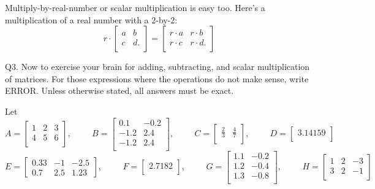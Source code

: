 Multiply-by-real-number or scalar multiplication is easy too.
Here's a multiplication of a real number with a 2-by-2:
\[
r \cdot 
\begin{bmatrix}
a & b \\
c & d.\\
\end{bmatrix}
=
\begin{bmatrix}
r \cdot a & r \cdot b \\
r \cdot c & r \cdot d.\\
\end{bmatrix}
\]

\newpage

Q3. Now to exercise your brain for adding, subtracting, and scalar 
multiplication of matrices.
For those expressions where the operations do not make sense,
write ERROR.
Unless otherwise stated, all answers must be exact.


Let 
\[
A
= 
\begin{bmatrix}
1 & 2 & 3 \\
4 & 5 & 6 \\
\end{bmatrix}
, 
\hspace{1cm}
B
= 
\begin{bmatrix}
0.1 & -0.2 \\
-1.2 & 2.4 \\
-1.2 & 2.4 \\
\end{bmatrix}
, 
\hspace{1cm}
C
= 
\begin{bmatrix}
\frac{2}{3} & \frac{4}{7} \\
\end{bmatrix}
, 
\hspace{1cm}
D
= 
\begin{bmatrix}
3.14159 \\
\end{bmatrix}
\]
\[
E
= 
\begin{bmatrix}
0.33 & -1 & -2.5 \\
0.7 & 2.5 & 1.23
\end{bmatrix}
, 
\hspace{1cm}
F
= 
\begin{bmatrix}
2.7182 \\
\end{bmatrix}
, 
\hspace{1cm}
G
= 
\begin{bmatrix}
1.1 & -0.2 \\
1.2 & -0.4 \\
1.3 & -0.8 \\
\end{bmatrix}
, 
\hspace{1cm}
H
= 
\begin{bmatrix}
1 & 2 & -3 \\
3 & 2 & -1 \\
\end{bmatrix}
\]

